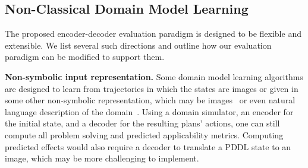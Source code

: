 \documentclass{article}
\newcommand{\miniparagraph}[1]{\textbf{#1.}}
\theoremstyle{definition}
\theoremstyle{remark}
\newif\ifaddcomments
\newcommand{\roni}[1]{\ifaddcomments{\textcolor{red}{[Roni: #1]}}\fi}
\newcommand{\yarin}[1]{\ifaddcomments{\textcolor{teal}{[Yarin: #1]}}\fi}
\begin{document}






\subsection{Non-Classical Domain Model Learning}
The proposed encoder-decoder evaluation paradigm is designed to be flexible and extensible. 
We list several such directions and outline how our evaluation paradigm can be modified to support them. 

\miniparagraph{Non-symbolic input representation}
Some domain model learning algorithms are designed to learn  from trajectories in which the states are images or given in some other non-symbolic representation, which may be images~\citep{asai2020learning,asai2022classical,xi2024neuro} or even natural language description of the domain~\citep{lindsay2017framer,liu2023llm+, guan2023leveraging}.%
Using a domain simulator, an encoder for the initial state, and a decoder for the resulting plans' actions, one can still compute all problem solving and predicted applicability metrics. 
Computing predicted effects would also require a decoder to translate a PDDL state to an image, which may be more challenging to implement. 
\end{document}
